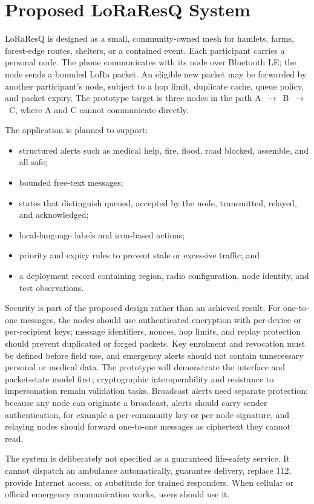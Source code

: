 \documentclass[journal]{IEEEtran}
\begin{document}
\section{Proposed LoRaResQ System}
LoRaResQ is designed as a small, community-owned mesh for hamlets, farms,
forest-edge routes, shelters, or a contained event. Each participant carries
a personal node. The phone communicates with its node over Bluetooth LE; the
node sends a bounded LoRa packet. An eligible new packet may be forwarded by
another participant's node, subject to a hop limit, duplicate cache, queue
policy, and packet expiry. The prototype target is three nodes in the path
\mbox{A $\rightarrow$ B $\rightarrow$ C}, where A and C cannot communicate
directly.

The application is planned to support:
\begin{itemize}
  \item structured alerts such as medical help, fire, flood, road blocked,
  assemble, and all safe;
  \item bounded free-text messages;
  \item states that distinguish queued, accepted by the node, transmitted,
  relayed, and acknowledged;
  \item local-language labels and icon-based actions;
  \item priority and expiry rules to prevent stale or excessive traffic; and
  \item a deployment record containing region, radio configuration, node
  identity, and test observations.
\end{itemize}

Security is part of the proposed design rather than an achieved result. For
one-to-one messages, the nodes should use authenticated encryption with
per-device or per-recipient keys; message identifiers, nonces, hop limits,
and replay protection should prevent duplicated or forged packets. Key
enrolment and revocation must be defined before field use, and emergency
alerts should not contain unnecessary personal or medical data. The prototype
will demonstrate the interface and packet-state model first; cryptographic
interoperability and resistance to impersonation remain validation tasks.
Broadcast alerts need separate protection: because any node can originate a
broadcast, alerts should carry sender authentication, for example a
per-community key or per-node signature, and relaying nodes should forward
one-to-one messages as ciphertext they cannot read.

The system is deliberately not specified as a guaranteed life-safety service.
It cannot dispatch an ambulance automatically, guarantee delivery, replace
112, provide Internet access, or substitute for trained responders. When
cellular or official emergency communication works, users should use it.
\end{document}
